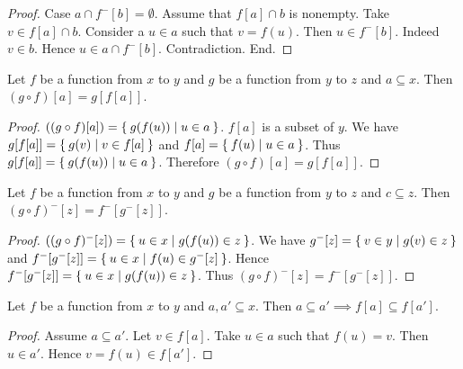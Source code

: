 \documentclass[../../sets-and-functions.ftl.tex]{subfiles}
\begin{document}
\begin{forthel}
\begin{proof}
      Case $a \cap f^{-}[b] = \emptyset$.
        Assume that $f[a] \cap b$ is nonempty.
        Take $v \in f[a] \cap b$.
        Consider a $u \in a$ such that $v = f(u)$.
        Then $u \in f^{-}[b]$.
        Indeed $v \in b$.
        Hence $u \in a \cap f^{-}[b]$.
        Contradiction.
      End.
    \end{proof}

    \begin{proposition}\label{SetTheory_02_02_522811}
      Let $f$ be a function from $x$ to $y$ and $g$ be a function from $y$ to $z$ and $a \subseteq x$.
      Then $(g \circ f)[a] = g[f[a]]$.
    \end{proposition}
    \begin{proof}
      $((g \circ f)[a]) = \Set{g(f(u)) | u \in a}$.
      $f[a]$ is a subset of $y$.
      We have $g[f[a]] = \Set{g(v) | v \in f[a]}$ and $f[a] = \Set{f(u) | u \in a}$.
      Thus $g[f[a]] = \Set{g(f(u)) | u \in a}$.
      Therefore $(g \circ f)[a] = g[f[a]]$.
    \end{proof}

    \begin{proposition}\label{SetTheory_02_02_819065}
      Let $f$ be a function from $x$ to $y$ and $g$ be a function from $y$ to $z$ and $c \subseteq z$.
      Then $(g \circ f)^{-}[z] = f^{-}[g^{-}[z]]$.
    \end{proposition}
    \begin{proof}
      $((g \circ f)^{-}[z]) = \Set{u \in x | g(f(u)) \in z}$.
      We have $g^{-}[z] = \Set{v \in y | g(v) \in z}$ and $f^{-}[g^{-}[z]] = \Set{u \in x | f(u) \in g^{-}[z]}$.
      Hence $f^{-}[g^{-}[z]] = \Set{u \in x | g(f(u)) \in z}$.
      Thus $(g \circ f)^{-}[z] = f^{-}[g^{-}[z]]$.
    \end{proof}

    \begin{proposition}\label{SetTheory_02_02_889945}
      Let $f$ be a function from $x$ to $y$ and $a,a' \subseteq x$.
      Then $a \subseteq a' \implies f[a] \subseteq f[a']$.
    \end{proposition}
    \begin{proof}
      Assume $a \subseteq a'$.
      Let $v \in f[a]$.
      Take $u \in a$ such that $f(u) = v$.
      Then $u \in a'$.
      Hence $v = f(u) \in f[a']$.
    \end{proof}


\end{forthel}
\end{document}
